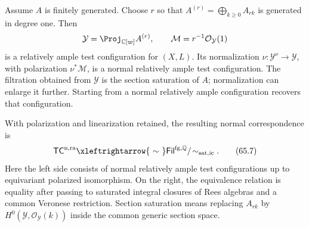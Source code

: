 \noindent\begin{minipage}{\linewidth}
\begin{theorem}\label{thm:rf-rees-reconstruction}
Assume $A$ is finitely generated. Choose $r$ so that $A^{(r)}=\bigoplus_{k\geq0}A_{rk}$ is generated in degree one. Then
\[
 \mathcal Y=\Proj_{\mathbb C[\varpi]}A^{(r)},\qquad
 \mathcal M=r^{-1}\mathcal O_{\mathcal Y}(1)
\]
is a relatively ample test configuration for $(X,L)$. Its normalization $\nu:\mathcal Y^\nu\to\mathcal Y$, with polarization $\nu^*\mathcal M$, is a normal relatively ample test configuration. The filtration obtained from $\mathcal Y$ is the section saturation of $A$; normalization can enlarge it further. Starting from a normal relatively ample configuration recovers that configuration.

With polarization and linearization retained, the resulting normal correspondence is
\[
 \mathsf{TC}^{\mathrm{n,ra}}
       \xleftrightarrow{\ \sim\ }
 \mathsf{Fil}^{\mathrm{fg},\mathbb Q}/\!\sim_{\mathrm{sat,ic}}.
\tag{65.7}\label{eq:rf-rees-equivalence}
\]
Here the left side consists of normal relatively ample test configurations up to equivariant polarized isomorphism. On the right, the equivalence relation is equality after passing to saturated integral closures of Rees algebras and a common Veronese restriction. Section saturation means replacing $A_{rk}$ by $H^0(\mathcal Y,\mathcal O_{\mathcal Y}(k))$ inside the common generic section space.
\end{theorem}
\end{minipage}\par

